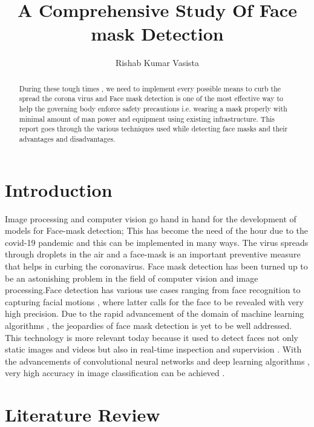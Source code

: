 \documentclass[12pt,a4paper]{article}
\title{A Comprehensive Study Of Face mask Detection}
\author{Rishab Kumar Vasista}
\begin{document}
\maketitle
\begin{abstract}
During these tough times , we need to implement every possible means to curb the spread the corona virus and Face mask detection is one of the most effective way to help the governing body enforce safety precautions i.e. wearing a mask properly with minimal amount of man power and equipment using existing infrastructure. This report goes through the various techniques used while detecting face masks and their advantages and disadvantages.
\end{abstract}
\section*{Introduction}
Image processing and computer vision go hand in hand for the development of models for Face-mask detection; This has become the need of the hour due to the covid-19 pandemic and this can be implemented in many ways. The virus spreads through droplets in the air and a face-mask is an important preventive measure that helps in curbing the coronavirus.
Face mask detection has been turned up to be an astonishing problem in the field of computer vision and image processing.Face detection has various use cases ranging from face recognition to capturing facial motions , where latter calls for the face to be revealed with very high precision. Due to the rapid advancement of the domain of machine learning algorithms , the jeopardies of face mask detection is yet to be well addressed. This technology is more relevant today because it used to detect faces not only static images and videos but also in real-time inspection and supervision . With the advancements of convolutional neural networks and deep learning algorithms , very high accuracy in image classification can be achieved .
\section*{Literature Review}
\end{document}

